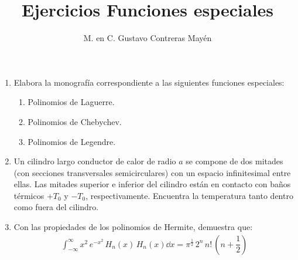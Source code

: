 
\title{Ejercicios Funciones especiales}\vspace{-3ex}
\author{M. en C. Gustavo Contreras Mayén}
\date{ }


\vspace{-4cm}
\maketitle
\fontsize{14}{14}\selectfont

\begin{enumerate}
\item Elabora la monografía correspondiente a las siguientes funciones especiales:
\begin{enumerate}
    \item Polinomios de Laguerre.
    \item Polinomios de Chebychev.
    \item Polinomios de Legendre.
\end{enumerate}
\item Un cilindro largo conductor de calor de radio $a$ se compone de dos mitades (con secciones transversales semicirculares) con un espacio infinitesimal entre ellas. Las mitades superior e inferior del cilindro están en contacto con baños térmicos $+T_{0}$ y $-T_{0}$, respectivamente. Encuentra la temperatura tanto dentro como fuera del cilindro.
\item Con las propiedades de los polinomios de Hermite, demuestra que:
\begin{align*}
\int_{-\infty}^{\infty} x^{2} \, e^{-x^{2}} \, H_{n} (x) \, H_{n} (x) \dd{x} = \pi^{\frac{1}{2}} \, 2^{n} \, n! \, (n + \dfrac{1}{2})
\end{align*}
\end{enumerate}
